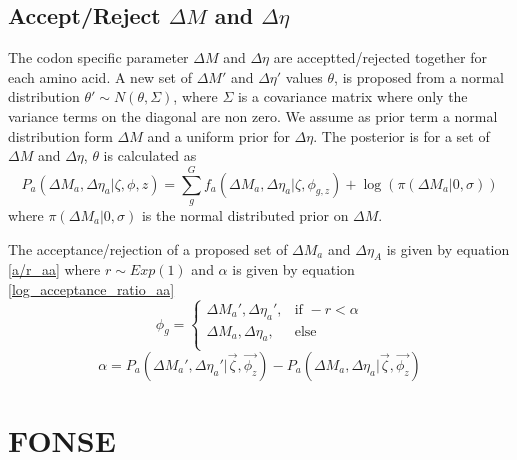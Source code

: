 \documentclass[11pt]{article}
\begin{document}
  \subsection{Accept/Reject $\Delta M$ and $\Delta \eta$}
  
  The codon specific parameter $\Delta M$ and $\Delta \eta$ are acceptted/rejected together for each amino acid.
  A new set of $\Delta M'$ and $\Delta \eta'$ values $\theta$, is proposed from a normal distribution $\theta' \sim N(\theta, \Sigma)$, where $\Sigma$ is a covariance matrix where only the variance terms on the 
  diagonal are non zero. We assume as prior term a normal distribution form $\Delta M$ and a uniform prior for $\Delta \eta$.
  The posterior is for a set of $\Delta M$ and $\Delta \eta$, $\theta$ is calculated as
    \begin{equation}
    P_a(\Delta M_a, \Delta \eta_a|\zeta, \phi, z) = \sum_g^G f_a(\Delta M_a, \Delta \eta_a|\zeta, \phi_{g,z}) + \log(\pi(\Delta M_a| 0, \sigma))
    \label{roc_lik_csp}
  \end{equation}
  where $\pi(\Delta M_a| 0, \sigma)$ is the normal distributed prior on $\Delta M$.
  
  The acceptance/rejection of a proposed set of $\Delta M_a$ and $\Delta \eta_A$ is given by equation \ref{a/r_aa} where $r \sim Exp(1)$ and $\alpha$ is given by equation \ref{log_acceptance_ratio_aa}
  \begin{equation}
    \phi_g = 
    \begin{cases}
      \Delta M_a', \Delta \eta_a',	& \text{if } -r < \alpha \\
      \Delta M_a, \Delta \eta_a,	& \text{else}  \\
    \end{cases}
     \label{a/r_aa}
  \end{equation}  
  \begin{equation}
    \alpha = P_a(\Delta M_a', \Delta \eta_a'|\vec{\zeta}, \vec{\phi_z}) - P_a(\Delta M_a, \Delta \eta_a|\vec{\zeta}, \vec{\phi_z})
    \label{log_acceptance_ratio_aa}
  \end{equation}
  

  
  \section{FONSE}
  
\end{document}
